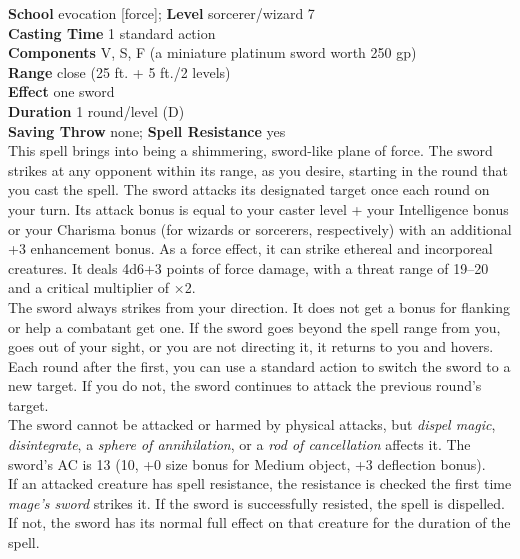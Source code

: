 \textbf{School} evocation [force]; \textbf{Level} sorcerer/wizard 7\\
\textbf{Casting Time} 1 standard action\\
\textbf{Components} V, S, F (a miniature platinum sword worth 250 gp)\\
\textbf{Range} close (25 ft. + 5 ft./2 levels)\\
\textbf{Effect} one sword\\
\textbf{Duration} 1 round/level (D)\\
\textbf{Saving Throw} none; \textbf{Spell Resistance} yes\\
This spell brings into being a shimmering, sword-like plane of force. The sword strikes at any opponent within its range, as you desire, starting in the round that you cast the spell. The sword attacks its designated target once each round on your turn. Its attack bonus is equal to your caster level + your Intelligence bonus or your Charisma bonus (for wizards or sorcerers, respectively) with an additional +3 enhancement bonus. As a force effect, it can strike ethereal and incorporeal creatures. It deals 4d6+3 points of force damage, with a threat range of 19–20 and a critical multiplier of ×2.\\
The sword always strikes from your direction. It does not get a bonus for flanking or help a combatant get one. If the sword goes beyond the spell range from you, goes out of your sight, or you are not directing it, it returns to you and hovers.\\
Each round after the first, you can use a standard action to switch the sword to a new target. If you do not, the sword continues to attack the previous round's target.\\
The sword cannot be attacked or harmed by physical attacks, but \textit{dispel magic}, \textit{disintegrate}, a \textit{sphere of annihilation}, or a \textit{rod of cancellation }affects it. The sword's AC is 13 (10, +0 size bonus for Medium object, +3 deflection bonus).\\
If an attacked creature has spell resistance, the resistance is checked the first time \textit{mage's sword }strikes it. If the sword is successfully resisted, the spell is dispelled. If not, the sword has its normal full effect on that creature for the duration of the spell.\\

